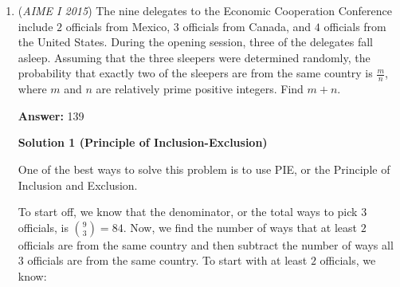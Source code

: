 \begin{enumerate}
 However, there is also another thing at the end; the $39 - 1$, using the 1 that was moved earlier! This means we need to add 38 to the number. Because we are in the negatives, adding 38 gives a lower absolute value. Using arithmetic, $-760 + 38 = -722$, but because the answer is the absolute value, the answer is $\boxed{722}$.

 



\textbf{Solution 5 (Summation Notation)}

We have\begin{align*}A&=39+\sum_{k=1}^{19}(2k-1)2k\\&=39+\sum_{k=1}^{19}4k^2-2k\\\end{align*}
\begin{align*}B&=1+\sum_{k=1}^{19}2k(2k+1)\\&=1+\sum_{k=1}^{19}4k^2+2k\\\end{align*}
Therefore,
 \[B-A=\left(\sum_{k=1}^{19}(4k^2+2k)-(4k^2-2k)\right)-38=\left(\sum_{k=1}^{19}4k\right)-38=760-38=\boxed{722}\]



	\item (\textit{AIME I 2015}) The nine delegates to the Economic Cooperation Conference include $2$ officials from Mexico, $3$ officials from Canada, and $4$ officials from the United States. During the opening session, three of the delegates fall asleep. Assuming that the three sleepers were determined randomly, the probability that exactly two of the sleepers are from the same country is $\frac{m}{n}$, where $m$ and $n$ are relatively prime positive integers. Find $m+n$.


 



 
 \textbf{Answer: }139



\textbf{Solution 1 (Principle of Inclusion-Exclusion)}

One of the best ways to solve this problem is to use PIE, or the Principle of Inclusion and Exclusion.

 To start off, we know that the denominator, or the total ways to pick $3$ officials, is $\binom{9}{3} = 84$. Now, we find the number of ways that at least $2$ officials are from the same country and then subtract the number of ways all $3$ officials are from the same country. To start with at least $2$ officials, we know:


\end{enumerate}
